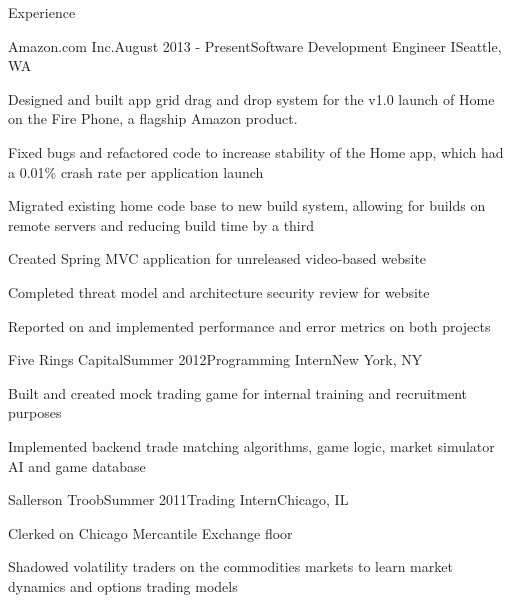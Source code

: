 \documentclass{resume} %
\begin{document}



\begin{rSection}{Experience}

\begin{rSubsection}{Amazon.com Inc.}{August 2013 - Present}{Software Development Engineer I}{Seattle, WA}
\item Designed and built app grid drag and drop system for the v1.0 launch of Home on the Fire Phone, a flagship Amazon product.
\item Fixed bugs and refactored code to increase stability of the Home app, which had a 0.01\% crash rate per application launch
\item Migrated existing home code base to new build system, allowing for builds on remote servers and reducing build time by a third
\item Created Spring MVC application for unreleased video-based website
\item Completed threat model and architecture security review for website
\item Reported on and implemented performance and error metrics on both projects
\end{rSubsection}


\begin{rSubsection}{Five Rings Capital}{Summer 2012}{Programming Intern}{New York, NY}
\item Built and created mock trading game for internal training and recruitment purposes
\item Implemented backend trade matching algorithms, game logic, market simulator AI and game database
\end{rSubsection}


\begin{rSubsection}{Sallerson Troob}{Summer 2011}{Trading Intern}{Chicago, IL}
\item Clerked on Chicago Mercantile Exchange floor
\item Shadowed volatility traders on the commodities markets to learn market dynamics and options trading models
\end{rSubsection}


\end{rSection}
\end{document}
